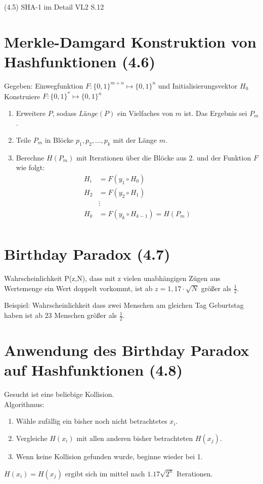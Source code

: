 (4.5) SHA-1 im Detail VL2 S.12

\section{Merkle-Damgard Konstruktion von Hashfunktionen (4.6)}
Gegeben: Einwegfunktion $F: \{0,1\}^{m+n} \mapsto \{0,1\}^n$ und Initialisierungsvektor $H_0$\\
Konstruiere $F: \{0,1\}^{*} \mapsto \{0,1\}^n$
\begin{enumerate}
  \item Erweitere $P$, sodass $Länge(P)$ ein Vielfaches von $m$ ist. Das Ergebnis sei $P_m$.
  \item Teile $P_m$ in Blöcke $p_1, p_2, \ldots, p_k$ mit der Länge $m$.
  \item Berechne $H(P_m)$ mit Iterationen über die Blöcke aus 2. und der Funktion $F$ wie folgt:
  	\begin{align*}
  		H_i &= F(y_1 \circ H_0) \\
  		H_2 &= F(y_2 \circ H_1) \\
  		& \vdots \\
  		H_k &= F(y_k \circ H_{k-1}) = H(P_m) \\
		\end{align*} 
\end{enumerate}

\section{Birthday Paradox (4.7)}
Wahrscheinlichkeit P(z,N), dass mit z vielen unabhängigen Zügen aus Wertemenge  ein Wert doppelt vorkommt, ist ab $z = 1,17 \cdot \sqrt{N}$ größer als $\frac{1}{2}$. 

Beispiel: Wahrscheinlichkeit dass zwei Menschen am gleichen Tag Geburtstag haben ist ab 23 Menschen größer als $\frac{1}{2}$.

\section{Anwendung des Birthday Paradox auf Hashfunktionen (4.8)}
\label{bDayHash}
Gesucht ist eine beliebige Kollision.\\
Algorithmus:
\begin{enumerate}
  \item Wähle zufällig ein bisher noch nicht betrachtetes $x_i$.
  \item Vergleiche $H(x_i)$ mit allen anderen bisher betrachteten $H(x_j)$.
  \item Wenn keine Kollision gefunden wurde, beginne wieder bei 1.
\end{enumerate} 
$H(x_i) = H(x_j)$ ergibt sich im mittel nach $ 1.17 \sqrt{2^n} $ Iterationen.

